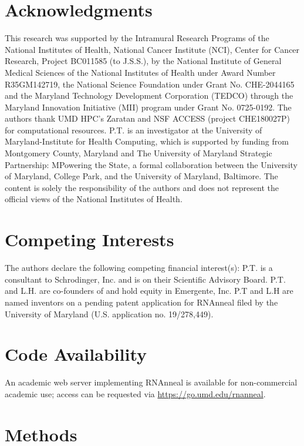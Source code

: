 \documentclass[%
aip,
 amsmath,amssymb,
reprint,%
twocolumn,
]{revtex4-1}
\begin{document}
{\section*{Acknowledgments}
This research was supported by the Intramural Research Programs of the National Institutes of Health, National Cancer Institute (NCI), Center for Cancer Research, Project BC011585 (to J.S.S.), by the National Institute of General Medical Sciences of the National Institutes of Health under Award Number R35GM142719, the National Science Foundation under Grant No. CHE-2044165 and the Maryland Technology Development Corporation (TEDCO) through the Maryland Innovation Initiative (MII) program under Grant No. 0725-0192. The authors thank UMD HPC's Zaratan and NSF ACCESS (project CHE180027P) for computational resources. P.T. is an investigator at the University of Maryland-Institute for Health Computing, which is supported by funding from Montgomery County, Maryland and The University of Maryland Strategic Partnership: MPowering the State, a formal collaboration between the University of Maryland, College Park, and the University of Maryland, Baltimore. The content is solely the responsibility of the authors and does not represent the official views of the National Institutes of Health.  

\section*{Competing Interests}
The authors declare the following competing financial interest(s): P.T. is a consultant to Schrodinger, Inc. and is on their Scientific Advisory Board.
P.T. and L.H. are co-founders of and hold equity in Emergente, Inc. P.T and L.H are named inventors on a pending patent application for RNAnneal filed by the University of Maryland (U.S. application no. 19/278,449).

\section*{Code Availability}
An academic web server implementing RNAnneal is available for non-commercial academic use; access can be requested via \url{https://go.umd.edu/rnanneal}.

\section*{Methods}

}
\end{document}
